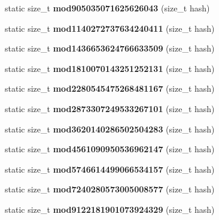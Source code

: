 \begin{DoxyCompactItemize}
\item 
static size\+\_\+t {\bfseries mod905035071625626043} (size\+\_\+t hash)\label{structska_1_1prime__number__hash__policy_aa4786ebde8415f8e4849a2a6b2fe8b51}

\item 
static size\+\_\+t {\bfseries mod1140272737634240411} (size\+\_\+t hash)\label{structska_1_1prime__number__hash__policy_a0bb24129504bbaf7e1f57a4659d39517}

\item 
static size\+\_\+t {\bfseries mod1436653624766633509} (size\+\_\+t hash)\label{structska_1_1prime__number__hash__policy_a4f05b7bb25f05f408f38808173639ebc}

\item 
static size\+\_\+t {\bfseries mod1810070143251252131} (size\+\_\+t hash)\label{structska_1_1prime__number__hash__policy_a127f1a25c8f167b355799e6b0f205f40}

\item 
static size\+\_\+t {\bfseries mod2280545475268481167} (size\+\_\+t hash)\label{structska_1_1prime__number__hash__policy_aa2dbd6ff1aca8cb6c6eb482f955ee853}

\item 
static size\+\_\+t {\bfseries mod2873307249533267101} (size\+\_\+t hash)\label{structska_1_1prime__number__hash__policy_a02c0c3d193ded834df4530d18238eadc}

\item 
static size\+\_\+t {\bfseries mod3620140286502504283} (size\+\_\+t hash)\label{structska_1_1prime__number__hash__policy_ace8ecc40481a0966f47f996b5ae10c3a}

\item 
static size\+\_\+t {\bfseries mod4561090950536962147} (size\+\_\+t hash)\label{structska_1_1prime__number__hash__policy_abd4506618480dfb75b35e9ee80902da5}

\item 
static size\+\_\+t {\bfseries mod5746614499066534157} (size\+\_\+t hash)\label{structska_1_1prime__number__hash__policy_ae3d5cbd7f7fdbf6edce98fa52dfa43f4}

\item 
static size\+\_\+t {\bfseries mod7240280573005008577} (size\+\_\+t hash)\label{structska_1_1prime__number__hash__policy_a88f7db1c2e4e6926f5371ec3b83abc2d}

\item 
static size\+\_\+t {\bfseries mod9122181901073924329} (size\+\_\+t hash)\label{structska_1_1prime__number__hash__policy_aad9d4d6cba1e6b7ff82d5fe82d74199b}


\end{DoxyCompactItemize}
